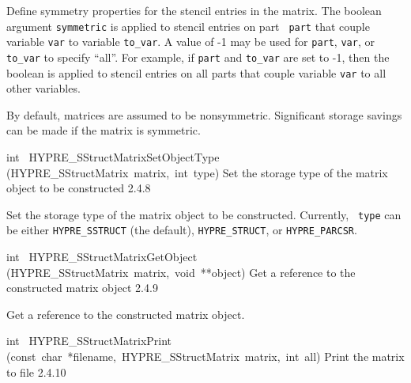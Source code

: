 \documentclass{article}
\begin{document}
\begin{cxxentry}
\begin{cxxentry}
\begin{cxxfunction}
\begin{cxxdoc}
Define symmetry properties for the stencil entries in the matrix.  The
boolean argument {\tt symmetric} is applied to stencil entries on part {\tt
part} that couple variable {\tt var} to variable {\tt to\_var}.  A value of
-1 may be used for {\tt part}, {\tt var}, or {\tt to\_var} to specify
``all''.  For example, if {\tt part} and {\tt to\_var} are set to -1, then
the boolean is applied to stencil entries on all parts that couple variable
{\tt var} to all other variables.

By default, matrices are assumed to be nonsymmetric.  Significant
storage savings can be made if the matrix is symmetric.
\end{cxxdoc}
\end{cxxfunction}
\begin{cxxfunction}
{int\ }
        {HYPRE\_SStructMatrixSetObjectType}
        {(HYPRE\_SStructMatrix\ matrix,\ int\ type)}
        {
Set the storage type of the matrix object to be constructed}
        {2.4.8}
\begin{cxxdoc}

Set the storage type of the matrix object to be constructed.  Currently, {\tt
type} can be either {\tt HYPRE\_SSTRUCT} (the default), {\tt HYPRE\_STRUCT},
or {\tt HYPRE\_PARCSR}.


\end{cxxdoc}
\end{cxxfunction}
\begin{cxxfunction}
{int\ }
        {HYPRE\_SStructMatrixGetObject}
        {(HYPRE\_SStructMatrix\ matrix,\ void\ **object)}
        {
Get a reference to the constructed matrix object}
        {2.4.9}
\begin{cxxdoc}

Get a reference to the constructed matrix object.


\end{cxxdoc}
\end{cxxfunction}
\begin{cxxfunction}
{int\ }
        {HYPRE\_SStructMatrixPrint}
        {(const\ char\ *filename,\ HYPRE\_SStructMatrix\ matrix,\ int\ all)}
        {
Print the matrix to file}
        {2.4.10}
\begin{cxxdoc}


\end{cxxdoc}
\end{cxxfunction}
\end{cxxentry}
\end{cxxentry}
\end{document}

